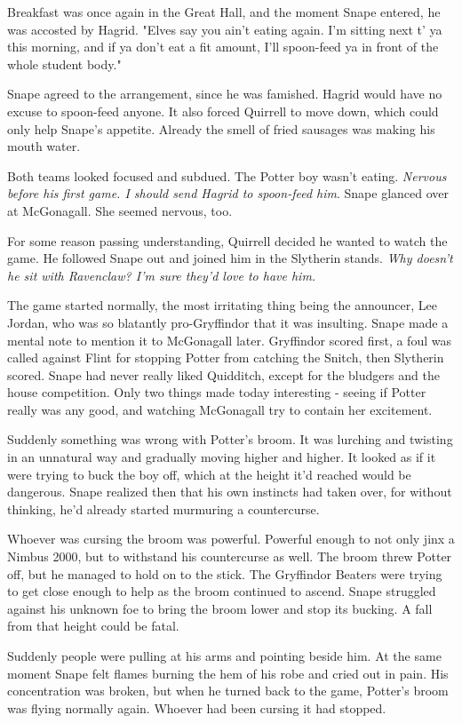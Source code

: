 Breakfast was once again in the Great Hall, and the moment Snape entered, he was accosted by Hagrid. "Elves say you ain't eating again. I'm sitting next t' ya this morning, and if ya don't eat a fit amount, I'll spoon-feed ya in front of the whole student body."

Snape agreed to the arrangement, since he was famished. Hagrid would have no excuse to spoon-feed anyone. It also forced Quirrell to move down, which could only help Snape's appetite. Already the smell of fried sausages was making his mouth water.

Both teams looked focused and subdued. The Potter boy wasn't eating. \emph{Nervous before his first game. I should send Hagrid to spoon-feed him}. Snape glanced over at McGonagall. She seemed nervous, too.

For some reason passing understanding, Quirrell decided he wanted to watch the game. He followed Snape out and joined him in the Slytherin stands. \emph{Why doesn't he sit with Ravenclaw? I'm sure they'd love to have him.}

The game started normally, the most irritating thing being the announcer, Lee Jordan, who was so blatantly pro-Gryffindor that it was insulting. Snape made a mental note to mention it to McGonagall later. Gryffindor scored first, a foul was called against Flint for stopping Potter from catching the Snitch, then Slytherin scored. Snape had never really liked Quidditch, except for the bludgers and the house competition. Only two things made today interesting - seeing if Potter really was any good, and watching McGonagall try to contain her excitement.

Suddenly something was wrong with Potter's broom. It was lurching and twisting in an unnatural way and gradually moving higher and higher. It looked as if it were trying to buck the boy off, which at the height it'd reached would be dangerous. Snape realized then that his own instincts had taken over, for without thinking, he'd already started murmuring a countercurse.

Whoever was cursing the broom was powerful. Powerful enough to not only jinx a Nimbus 2000, but to withstand his countercurse as well. The broom threw Potter off, but he managed to hold on to the stick. The Gryffindor Beaters were trying to get close enough to help as the broom continued to ascend. Snape struggled against his unknown foe to bring the broom lower and stop its bucking. A fall from that height could be fatal.

Suddenly people were pulling at his arms and pointing beside him. At the same moment Snape felt flames burning the hem of his robe and cried out in pain. His concentration was broken, but when he turned back to the game, Potter's broom was flying normally again. Whoever had been cursing it had stopped.

